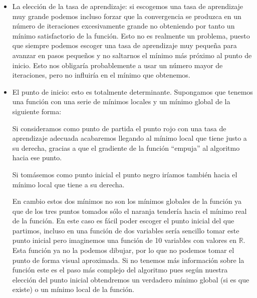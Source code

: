 \documentclass[12pt,a4paper]{article}
\begin{document}
\begin{itemize}
	\item La elección de la tasa de aprendizaje: si escogemos una tasa de aprendizaje muy grande podemos incluso forzar que la convergencia se produzca en un número de iteraciones excesivamente grande no obteniendo por tanto un mínimo satisfactorio de la función. Esto no es realmente un problema, puesto que siempre podemos escoger una tasa de aprendizaje muy pequeña para avanzar en pasos pequeños y no saltarnos el mínimo más próximo al punto de inicio. Esto nos obligaría probablemente a usar un número mayor de iteraciones, pero no influiría en el mínimo que obtenemos.
	\item El punto de inicio: esto es totalmente determinante. Supongamos que tenemos una función con una serie de mínimos locales y un mínimo global de la siguiente forma:
	\begin{figure}[H]
		\centering
	\end{figure}
	Si consideramos como punto de partida el punto rojo con una tasa de aprendizaje adecuada acabaremos llegando al mínimo local que tiene justo a su derecha, gracias a que el gradiente de la función  ``empuja'' al algoritmo hacia ese punto. 
	
	Si tomásemos como punto inicial el punto negro iríamos también hacia el mínimo local que tiene a su derecha.
	
	En cambio estos dos mínimos no son los mínimos globales de la función ya que de los tres puntos tomados sólo el naranja tendería hacia el mínimo real de la función. En este caso es fácil poder escoger el punto inicial del que partimos, incluso en una función de dos variables sería sencillo tomar este punto inicial pero imaginemos una función de 10 variables con valores en $\mathbb{R}$. Esta función ya no la podemos dibujar, por lo que no podemos tomar el punto de forma visual aproximada. Si no tenemos más información sobre la función este es el paso más complejo del algoritmo pues según nuestra elección del punto inicial obtendremos un verdadero mínimo global (si es que existe) o un mínimo local de la función.
\end{itemize}
\end{document}
